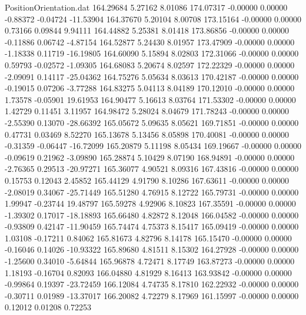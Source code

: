 \begin{filecontents}{PositionOrientation.dat}
 164.29684    5.27162    8.01086   174.07317   -0.00000    0.00000   -0.88372   -0.04724  -11.53904
 164.37670    5.20104    8.00708   173.15164   -0.00000    0.00000    0.73166    0.09844    9.94111
 164.44882    5.25381    8.01418   173.86856   -0.00000    0.00000   -0.11886    0.06742   -4.87154
 164.52877    5.24430    8.01957   173.47909   -0.00000    0.00000   -1.18338    0.11719  -16.19805
 164.60090    5.15894    8.02803   172.31066   -0.00000    0.00000    0.59793   -0.02572   -1.09305
 164.68083    5.20674    8.02597   172.22329   -0.00000    0.00000   -2.09091    0.14117  -25.04362
 164.75276    5.05634    8.03613   170.42187   -0.00000    0.00000   -0.19015    0.07206   -3.77288
 164.83275    5.04113    8.04189   170.12010   -0.00000    0.00000    1.73578   -0.05901   19.61953
 164.90477    5.16613    8.03764   171.53302   -0.00000    0.00000    1.42729    0.11451    3.11957
 164.98472    5.28024    8.04679   171.78243   -0.00000    0.00000   -2.55390    0.13070  -28.66392
 165.05672    5.09635    8.05621   169.71851   -0.00000    0.00000    0.47731    0.03469    8.52270
 165.13678    5.13456    8.05898   170.40081   -0.00000    0.00000   -0.31359   -0.06447  -16.72099
 165.20879    5.11198    8.05434   169.19667   -0.00000    0.00000   -0.09619    0.21962   -3.09890
 165.28874    5.10429    8.07190   168.94891   -0.00000    0.00000   -2.76365    0.29513  -20.97271
 165.36077    4.90521    8.09316   167.43816   -0.00000    0.00000    0.15753    0.12043    2.45852
 165.44129    4.91790    8.10286   167.63611   -0.00000    0.00000   -2.08019    0.34067  -25.71449
 165.51280    4.76915    8.12722   165.79731   -0.00000    0.00000    1.99947   -0.23744   19.48797
 165.59278    4.92906    8.10823   167.35591   -0.00000    0.00000   -1.39302    0.17017  -18.18893
 165.66480    4.82872    8.12048   166.04582   -0.00000    0.00000   -0.93809    0.42147  -11.90459
 165.74474    4.75373    8.15417   165.09419   -0.00000    0.00000    1.03108   -0.17211    0.84062
 165.81673    4.82796    8.14178   165.15470   -0.00000    0.00000   -0.16046    0.14026  -10.93322
 165.89680    4.81511    8.15302   164.27928   -0.00000    0.00000   -1.25600    0.34010   -5.64844
 165.96878    4.72471    8.17749   163.87273   -0.00000    0.00000    1.18193   -0.16704    0.82093
 166.04880    4.81929    8.16413   163.93842   -0.00000    0.00000   -0.99864    0.19397  -23.72459
 166.12084    4.74735    8.17810   162.22932   -0.00000    0.00000   -0.30711    0.01989  -13.37017
 166.20082    4.72279    8.17969   161.15997   -0.00000    0.00000    0.12012    0.01208    0.72253

\end{filecontents}
